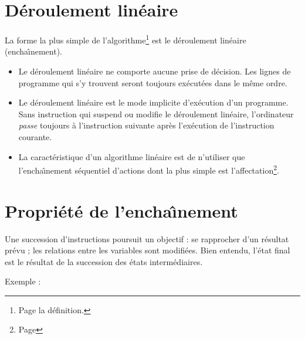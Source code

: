 \label{Lineaire}
\section*{D\'eroulement lin\'eaire}
   La forme la plus simple de l'algorithme\footnote{Page
   \pageref{Algorithme} la d\'efinition.}
   est le d\'eroulement lin\'eaire (encha\^\i nement).
\begin{itemize}
\item      Le d\'eroulement lin\'eaire ne comporte aucune prise de d\'ecision.
       Les lignes de programme qui s'y trouvent seront toujours ex\'ecut\'ees
       dans le m\^eme ordre.

\item      Le d\'eroulement lin\'eaire est le mode implicite d'ex\'ecution d'un
       programme. 
	   Sans instruction qui
       suspend ou modifie le d\'eroulement lin\'eaire, l'ordinateur {\em passe}
       toujours \`a l'instruction  suivante apr\`es l'ex\'ecution
       de l'instruction courante.

\item La caract\'eristique
       d'un algorithme lin\'eaire est de n'utiliser que l'encha\^\i nement
       s\'equentiel d'actions dont la plus simple est l'affectation\footnote{
	   Page \pageref{Affectation}}.

\end{itemize}
\section*{Propri\'et\'e de l'encha\^\i nement}

Une succession d'instructions poursuit un objectif : se rapprocher
d'un r\'esultat pr\'evu ;  
les relations entre les variables sont modifi\'ees. Bien entendu, l'\'etat final
est le r\'esultat de la succession des \'etats interm\'ediaires.

Exemple :

